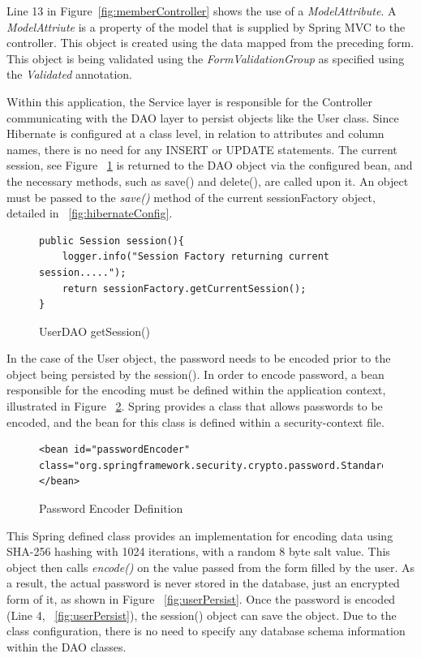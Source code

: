Line 13 in Figure~\ref{fig:memberController} shows the use of a \textit{ModelAttribute}. A \textit{ModelAttriute} is a property of the model that is supplied by Spring MVC to the controller. This object is created using the data mapped from the preceding form. This object is being validated using the \textit{FormValidationGroup} as specified using the \textit{Validated} annotation.

Within this application, the Service layer is responsible for the Controller communicating with the DAO layer to persist objects like the User class. Since Hibernate is configured at a class level, in relation to attributes and column names, there is no need for any INSERT or UPDATE statements. The current session, see Figure ~\ref{fig:getSession} is returned to the DAO object via the configured bean, and the necessary methods, such as save() and delete(), are called upon it. An object must be passed to the \textit{save()} method of the current sessionFactory object, detailed in ~\ref{fig:hibernateConfig}. 

\begin{figure}[H]
\begin{lstlisting}
public Session session(){
	logger.info("Session Factory returning current session.....");
	return sessionFactory.getCurrentSession();
}
\end{lstlisting}
\caption{UserDAO getSession()}
\label{fig:getSession}
\end{figure}

In the case of the User object, the password needs to be encoded prior to the object being persisted by the session(). In order to encode password, a bean responsible for the encoding must be defined within the application context, illustrated in Figure ~\ref{fig:passwordEncoder}. Spring provides a class that allows passwords to be encoded, and the bean for this class is defined within a security-context file.

\begin{figure}[H]
\begin{lstlisting}
<bean id="passwordEncoder"
class="org.springframework.security.crypto.password.StandardPasswordEncoder">
</bean>
\end{lstlisting}
\caption{Password Encoder Definition}
\label{fig:passwordEncoder}
\end{figure}

This Spring defined class provides an implementation for encoding data using SHA-256 hashing with 1024 iterations, with a random 8 byte salt value. This object then calls \textit{encode()} on the value passed from the form filled by the user. As a result, the actual password is never stored in the database, just an encrypted form of it, as shown in Figure ~\ref{fig:userPersist}. Once the password is encoded (Line 4, ~\ref{fig:userPersist}), the session() object can save the object. Due to the class configuration, there is no need to specify any database schema information within the DAO classes.

